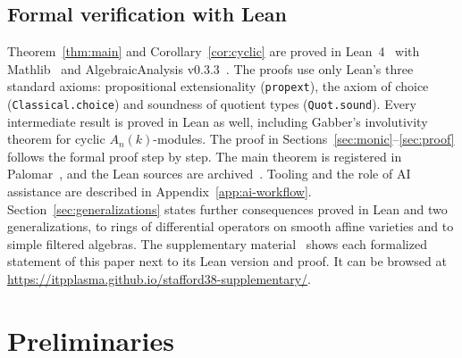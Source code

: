 \documentclass[pdflatex,sn-mathphys-num]{sn-jnl}
\numberwithin{equation}{section}
\theoremstyle{thmstyleone}
\theoremstyle{thmstyletwo}
\begin{document}
\subsection{Formal verification with Lean}\label{sec:formal}
Theorem~\ref{thm:main} and
Corollary~\ref{cor:cyclic} are proved in Lean~4~\cite{Lean4} with
Mathlib~\cite{Mathlib2020} and AlgebraicAnalysis
v0.3.3~\cite{AlgebraicAnalysis033}. The proofs use only Lean's three
standard axioms: propositional extensionality (\texttt{propext}), the axiom
of choice (\texttt{Classical.choice}) and soundness of quotient types
(\texttt{Quot.sound}). Every intermediate result is proved in Lean as well,
including Gabber's involutivity theorem for cyclic $A_n(k)$-modules. The
proof in Sections~\ref{sec:monic}--\ref{sec:proof} follows the formal proof
step by step. The main theorem is registered
in Palomar~\cite{Stafford38Palomar2026}, and the Lean sources are
archived~\cite{Stafford38Zenodo140}. Tooling and the role of AI assistance
are described in Appendix~\ref{app:ai-workflow}. Section~\ref{sec:generalizations} states further consequences proved in Lean and two generalizations, to rings of differential operators on smooth affine varieties and to simple filtered algebras.
The supplementary
material~\cite{Stafford38Supplementary032} shows each formalized statement of
this paper next to its Lean version and proof. It can be browsed at
\url{https://itpplasma.github.io/stafford38-supplementary/}.

\section{Preliminaries}\label{sec:setting}
\end{document}
